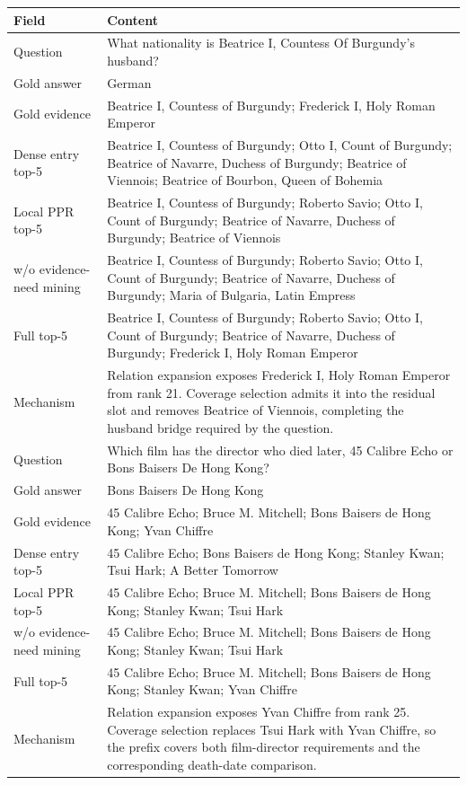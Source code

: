 \begin{center}
\centering
\scriptsize
\setlength{\tabcolsep}{3pt}
\begin{tabular}{p{}p{}}
\toprule
Field & Content \\
\midrule
Question
& What nationality is Beatrice I, Countess Of Burgundy's husband? \\
Gold answer
& German \\
Gold evidence
& Beatrice I, Countess of Burgundy; Frederick I, Holy Roman Emperor \\
Dense entry top-5
& Beatrice I, Countess of Burgundy; Otto I, Count of Burgundy; Beatrice of Navarre, Duchess of Burgundy; Beatrice of Viennois; Beatrice of Bourbon, Queen of Bohemia \\
Local PPR top-5
& Beatrice I, Countess of Burgundy; Roberto Savio; Otto I, Count of Burgundy; Beatrice of Navarre, Duchess of Burgundy; Beatrice of Viennois \\
w/o evidence-need mining
& Beatrice I, Countess of Burgundy; Roberto Savio; Otto I, Count of Burgundy; Beatrice of Navarre, Duchess of Burgundy; Maria of Bulgaria, Latin Empress \\
Full \methodname{} top-5
& Beatrice I, Countess of Burgundy; Roberto Savio; Otto I, Count of Burgundy; Beatrice of Navarre, Duchess of Burgundy; Frederick I, Holy Roman Emperor \\
Mechanism
& Relation expansion exposes Frederick I, Holy Roman Emperor from rank 21. Coverage selection admits it into the residual slot and removes Beatrice of Viennois, completing the husband bridge required by the question. \\
\midrule
Question
& Which film has the director who died later, 45 Calibre Echo or Bons Baisers De Hong Kong? \\
Gold answer
& Bons Baisers De Hong Kong \\
Gold evidence
& 45 Calibre Echo; Bruce M. Mitchell; Bons Baisers de Hong Kong; Yvan Chiffre \\
Dense entry top-5
& 45 Calibre Echo; Bons Baisers de Hong Kong; Stanley Kwan; Tsui Hark; A Better Tomorrow \\
Local PPR top-5
& 45 Calibre Echo; Bruce M. Mitchell; Bons Baisers de Hong Kong; Stanley Kwan; Tsui Hark \\
w/o evidence-need mining
& 45 Calibre Echo; Bruce M. Mitchell; Bons Baisers de Hong Kong; Stanley Kwan; Tsui Hark \\
Full \methodname{} top-5
& 45 Calibre Echo; Bruce M. Mitchell; Bons Baisers de Hong Kong; Stanley Kwan; Yvan Chiffre \\
Mechanism
& Relation expansion exposes Yvan Chiffre from rank 25. Coverage selection replaces Tsui Hark with Yvan Chiffre, so the prefix covers both film-director requirements and the corresponding death-date comparison. \\
\bottomrule
\end{tabular}
\end{center}

